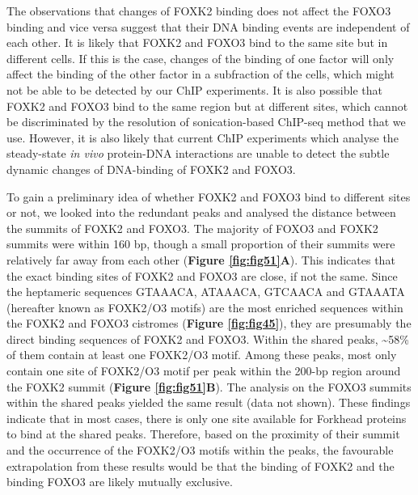 The observations that changes of FOXK2 binding does not affect the FOXO3 binding and vice versa suggest that their DNA binding events are independent of each other. It is likely that FOXK2 and FOXO3 bind to the same site but in different cells. If this is the case, changes of the binding of one factor will only affect the binding of the other factor in a subfraction of the cells, which might not be able to be detected by our ChIP experiments. It is also possible that FOXK2 and FOXO3 bind to the same region but at different sites, which cannot be discriminated by the resolution of sonication-based ChIP-seq method that we use. However, it is also likely that current ChIP experiments which analyse the steady-state \textit{in vivo} protein-DNA interactions are unable to detect the subtle dynamic changes of DNA-binding of FOXK2 and FOXO3.

To gain a preliminary idea of whether FOXK2 and FOXO3 bind to different sites or not, we looked into the redundant peaks and analysed the distance between the summits of FOXK2 and FOXO3. The majority of FOXO3 and FOXK2 summits were within 160 bp, though a small proportion of their summits were relatively far away from each other (\textbf{Figure \ref{fig:fig51}A}). This indicates that the exact binding sites of FOXK2 and FOXO3 are close, if not the same. Since the heptameric sequences GTAAACA, ATAAACA, GTCAACA and GTAAATA (hereafter known as FOXK2/O3 motifs) are the most enriched sequences within the FOXK2 and FOXO3 cistromes (\textbf{Figure \ref{fig:fig45}}), they are presumably the direct binding sequences of FOXK2 and FOXO3. Within the shared peaks, \textasciitilde 58\% of them contain at least one FOXK2/O3 motif. Among these peaks, most only contain one site of FOXK2/O3 motif per peak within the 200-bp region around the FOXK2 summit (\textbf{Figure \ref{fig:fig51}B}). The analysis on the FOXO3 summits within the shared peaks yielded the same result (data not shown). These findings indicate that in most cases, there is only one site available for Forkhead proteins to bind at the shared peaks. Therefore, based on the proximity of their summit and the occurrence of the FOXK2/O3 motifs within the peaks, the favourable extrapolation from these results would be that the binding of FOXK2 and the binding FOXO3 are likely mutually exclusive.

